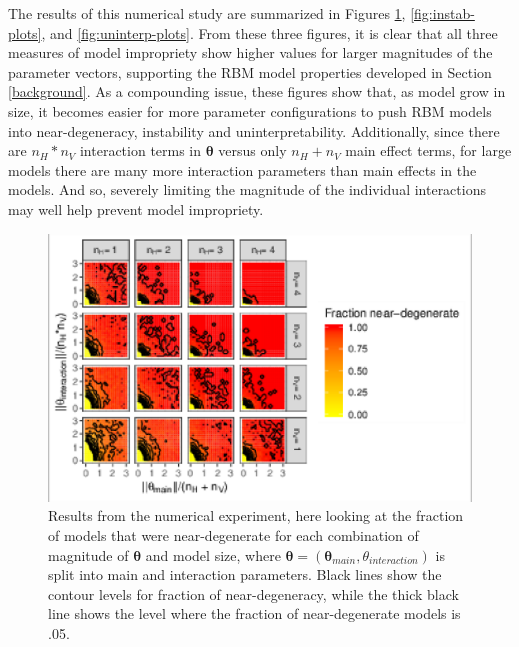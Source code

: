 \documentclass[12pt]{article}
\theoremstyle{definition}
\newcommand{\nv}{{n_{\scriptscriptstyle V}}}
\newcommand{\nh}{{n_{\scriptscriptstyle H}}}
\begin{document}
The results of this numerical study are summarized in Figures
\ref{fig:degen-plots}, \ref{fig:instab-plots}, and
\ref{fig:uninterp-plots}. From these three figures, it is clear that all
three measures of model impropriety show higher values for larger
magnitudes of the parameter vectors, supporting the RBM model properties
developed in Section \ref{background}. As a compounding issue, these
figures show that, as model grow in size, it becomes easier for more
parameter configurations to push RBM models into near-degeneracy,
instability and uninterpretability. Additionally, since there are
\(\nh*\nv\) interaction terms in \(\boldsymbol \theta\) versus only
\(\nh + \nv\) main effect terms, for large models there are many more
interaction parameters than main effects in the models. And so, severely
limiting the magnitude of the individual interactions may well help
prevent model impropriety. \par
\begin{figure}
\includegraphics{paper_files/figure-latex/degen-plots-1} \caption{Results from the numerical experiment, here looking at the fraction of models that were near-degenerate for each combination of magnitude of $\boldsymbol \theta$ and model size, where $\boldsymbol \theta = (\boldsymbol \theta_{main}, \theta_{interaction})$ is split into main and interaction parameters. Black lines show the contour levels for fraction of near-degeneracy, while the thick black line shows the level where the fraction of near-degenerate models is .05.}\label{fig:degen-plots}
\end{figure}
\end{document}
